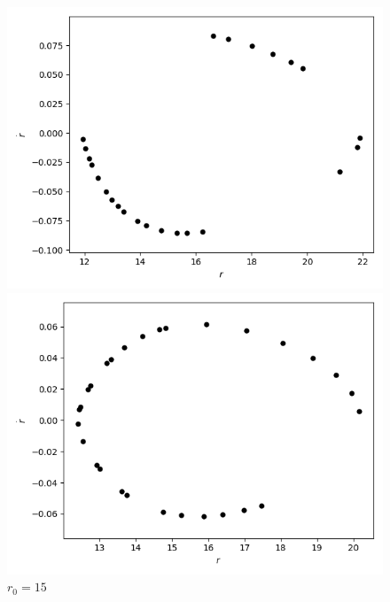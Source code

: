\documentclass[10pt,a4paper]{report}
\begin{document}
\begin{figure}[!ht]
\begin{minipage}[b]{0.5\linewidth}
\centering
\includegraphics[width=\textwidth]{4/r0=8.png}
\caption{$r_0=10$}
\label{fig:figure1}
\end{minipage}
\hspace{0.5cm}
\begin{minipage}[b]{0.5\linewidth}
\centering
\includegraphics[width=\textwidth]{4/r0=10.png}
\caption{$r_0=15$}
\label{fig:figure2}
\end{minipage}
\end{figure}
\end{document}
